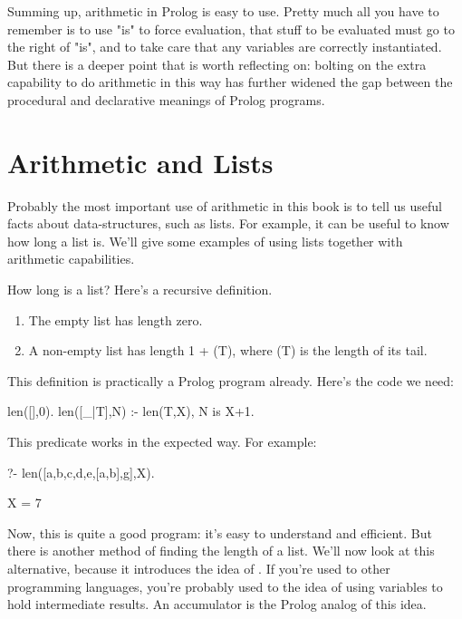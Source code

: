 Summing up, arithmetic in Prolog is easy to use.  Pretty much all you
have to remember is to use "is" to force evaluation, that stuff to be
evaluated must go to the right of "is", and to take care that any
variables are correctly instantiated.  But there is a deeper point
that is worth reflecting on: bolting on the extra capability to do
arithmetic in this way has further widened the gap between the
procedural and declarative meanings of Prolog programs.





\section{Arithmetic and Lists}\label{SEC.L5.ARITHMETIC-AND-LISTS}

Probably the most important use of arithmetic in this book is to tell
us useful facts about data-structures, such as lists.  For example, it
can be useful to know how long a list is.  We'll give some examples of
using lists together with arithmetic capabilities.

How long is a list? Here's a recursive definition.
\begin{enumerate}
\item{}The empty list has length zero.
\item{}A non-empty list has length
         1 + (T), where (T) is the length of its
        tail.
\end{enumerate}


This definition is practically a Prolog program already.  Here's the
code we need:
\begin{LPNcodedisplay}
len([],0).
len([_|T],N) :- len(T,X), N is X+1.
\end{LPNcodedisplay}

This predicate works in the expected way.
For example:
\begin{LPNcodedisplay}
?- len([a,b,c,d,e,[a,b],g],X).

X = 7
\end{LPNcodedisplay}

\clearpage
Now, this is quite a good program: it's easy to understand and
efficient.  But there is another method of finding the length of a
list.  We'll now look at this alternative, because it introduces the
idea of . If you're used to other programming
languages, you're probably used to the idea of using variables to hold
intermediate results.  An accumulator is the Prolog analog of this
idea.


